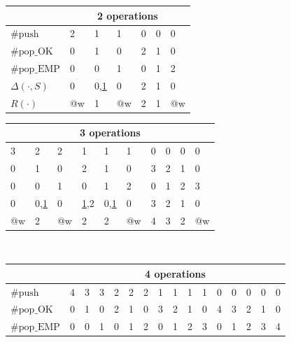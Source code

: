 \begin{figure*}[ht]
  \centering
  \scriptsize
  \begin{tabular}{|l|p{4mm}p{6mm}p{4mm}p{4mm}p{4mm}p{4mm}|}
    \hline
    & \multicolumn{6}{c|}{2 operations} \\
    \hline
    $\#\mathrm{push}$ 
    & 2 & 1 & 1 & 0 & 0 & 0 \\
    $\#\mathrm{pop\_OK}$ 
    & 0 & 1 & 0 & 2 & 1 & 0 \\
    $\#\mathrm{pop\_EMP}$
    & 0 & 0 & 1 & 0 & 1 & 2 \\
    \hline
    $\Delta(\cdot,S)$ %
    & 0 & 0,\underline{1} & 0 & 2 & 1 & 0 \\
    $R(\cdot)$
    & @w & 1 & @w & 2 & 1 & @w \\
    \hline
  \end{tabular}
  \begin{tabular}{%
    |p{4mm}p{6mm}p{4mm}p{6mm}p{6mm}p{4mm}p{4mm}p{4mm}p{4mm}p{4mm}|}
    \hline
    \multicolumn{10}{|c|}{3 operations} \\
    \hline
    3 & 2 & 2 & 1 & 1 & 1 & 0 & 0 & 0 & 0 \\
    0 & 1 & 0 & 2 & 1 & 0 & 3 & 2 & 1 & 0 \\
    0 & 0 & 1 & 0 & 1 & 2 & 0 & 1 & 2 & 3 \\
    \hline
    0 & 0,\underline{1} & 0 & \underline{1},2 & 0,\underline{1} & 0 & 3 & 2 & 1 & 0 \\
    @w & 2 & @w & 2 & 2 & @w & 4 & 3 & 2 & @w \\
    \hline
  \end{tabular}
  \\[1mm]
  \begin{tabular}{|l|p{4mm}p{6mm}p{4mm}p{8mm}p{6mm}p{4mm}p{6mm}p{6mm}p{6mm}%
    p{4mm}p{4mm}p{4mm}p{4mm}p{4mm}p{4mm}|}
    \hline
    & \multicolumn{15}{c|}{4 operations} \\
    \hline
    $\#\mathrm{push}$ 
    & 4 & 3 & 3 & 2 & 2 & 2 & 1 & 1 & 1 & 1 & 0 & 0 & 0 & 0 & 0 \\
    $\#\mathrm{pop\_OK}$ 
    & 0 & 1 & 0 & 2 & 1 & 0 & 3 & 2 & 1 & 0 & 4 & 3 & 2 & 1 & 0 \\
    $\#\mathrm{pop\_EMP}$
    & 0 & 0 & 1 & 0 & 1 & 2 & 0 & 1 & 2 & 3 & 0 & 1 & 2 & 3 & 4 \\
    \hline

\end{tabular}
\end{figure*}
